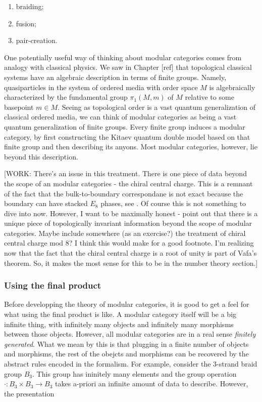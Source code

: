 \begin{enumerate}
\item braiding;
\item fusion;
\item pair-creation.
\end{enumerate}

One potentially useful way of thinking about modular categories comes from analogy with classical physics. We saw in Chapter [ref] that topological classical systems have an algebraic description in terms of finite groups. Namely, quasiparticles in the system of ordered media with order space $M$ is algebraically characterized by the fundamental group $\pi_1(M,m)$ of $M$ relative to some basepoint $m\in M$. Seeing as topological order is a vast quantum generalization of classical ordered media, we can think of modular categories as being a vast quantum generalization of finite groups. Every finite group induces a modular category, by first constructing the Kitaev quantum double model based on that finite group and then describing its anyons. Most modular categories, however, lie beyond this description.

[WORK: There's an issue in this treatment. There is one piece of data beyond the scope of an modular categories - the chiral central charge. This is a remnant of the fact that the bulk-to-boundary correspondane is not exact because the boundary can have stacked $E_8$ phases, see \cite{bonderson2021measuring}. Of course this is not something to dive into now. However, I want to be maximally honest - point out that there is a unique piece of topologically invariant information beyond the scope of modular categories. Maybe include somewhere (as an exercise?) the treatment of chiral central charge mod 8? I think this would make for a good footnote. I'm realizing now that the fact that the chiral central charge is a root of unity is part of Vafa's theorem. So, it makes the most sense for this to be in the number theory section.] 

\subsubsection{Using the final product}

Before developping the theory of modular categories, it is good to get a feel for what using the final product is like. A modular category itself will be a big infinite thing, with infinitely many objects and infinitely many morphisms between those objects. However, all modular categories are in a real sense \textit{finitely generated}. What we mean by this is that plugging in a finite number of objects and morphisms, the rest of the obejcts and morphisms can be recovered by the abstract rules encoded in the formalism. For example, consider the 3-strand braid group $B_3$. This group has ininitely many elements and the group operation $\cdot: B_3\times B_3\to B_3$ takes a-priori an infinite amount of data to describe. However, the presentation

